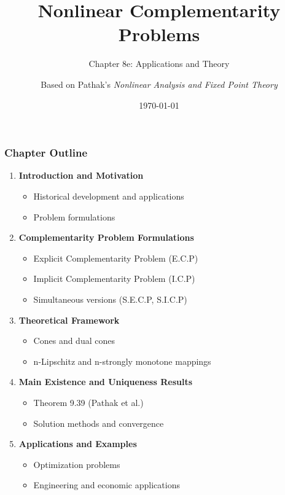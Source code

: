 \documentclass[aspectratio=169,10pt]{beamer}
\title[Nonlinear Complementarity Problems]{Nonlinear Complementarity Problems}
\subtitle{Chapter 8e: Applications and Theory}
\author{Based on Pathak's \textit{Nonlinear Analysis and Fixed Point Theory}}
\date{\today}
\begin{document}
\begin{frame}
\titlepage
\end{frame}

\begin{frame}[fragile]
\frametitle{Chapter Outline}

\begin{enumerate}
    \item \textbf{Introduction and Motivation}
    \begin{itemize}
        \item Historical development and applications
        \item Problem formulations
    \end{itemize}

    \item \textbf{Complementarity Problem Formulations}
    \begin{itemize}
        \item Explicit Complementarity Problem (E.C.P)
        \item Implicit Complementarity Problem (I.C.P)
        \item Simultaneous versions (S.E.C.P, S.I.C.P)
    \end{itemize}

    \item \textbf{Theoretical Framework}
    \begin{itemize}
        \item Cones and dual cones
        \item n-Lipschitz and n-strongly monotone mappings
    \end{itemize}

    \item \textbf{Main Existence and Uniqueness Results}
    \begin{itemize}
        \item Theorem 9.39 (Pathak et al.)
        \item Solution methods and convergence
    \end{itemize}

    \item \textbf{Applications and Examples}
    \begin{itemize}
        \item Optimization problems
        \item Engineering and economic applications
    \end{itemize}
\end{enumerate}

\end{frame}
\end{document}
